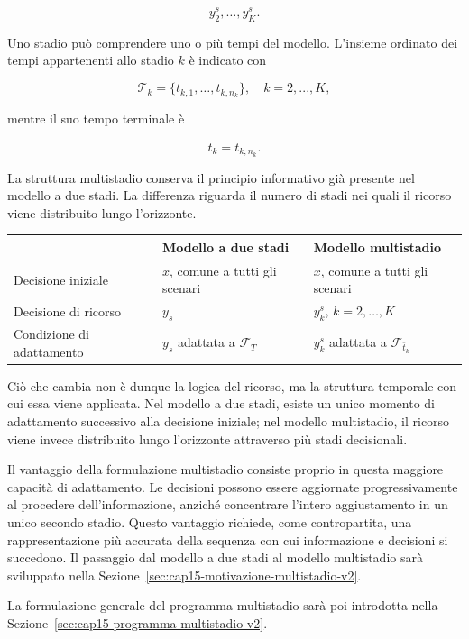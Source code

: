 \[
y_2^s,\ldots,y_K^s.
\]

Uno stadio pu\`o comprendere uno o pi\`u tempi del modello. L'insieme ordinato
dei tempi appartenenti allo stadio $k$ \`e indicato con

\[
\mathcal T_k
=
\{t_{k,1},\ldots,t_{k,n_k}\}, \quad k=2,...,K,
\] 

\noindent mentre il suo tempo terminale \`e

\[
\bar t_k
=
t_{k,n_k}.
\]

La struttura multistadio conserva il principio informativo gi\`a presente
nel modello a due stadi. La differenza riguarda il numero di stadi nei quali
il ricorso viene distribuito lungo l'orizzonte.

\begin{center}
\begin{tabular}{|p{2.8cm}|p{3.7cm}|p{3.7cm}|}
\hline
 & \textbf{Modello a due stadi} & \textbf{Modello multistadio} \\
\hline
\raggedright Decisione iniziale
&
$x$, comune a tutti gli scenari
&
$x$, comune a tutti gli scenari
\\
\hline
\raggedright Decisione di ricorso
&
$y_s$
&
$y_k^s$, \quad $k=2,\ldots,K$
\\
\hline
\raggedright Condizione di adattamento
&
$y_s$ adattata a $\mathcal F_T$
&
$y_k^s$ adattata a $\mathcal F_{\bar t_k}$
\\
\hline
\end{tabular}
\end{center}

Ci\`o che cambia non \`e dunque la logica del ricorso, ma la struttura
temporale con cui essa viene applicata. Nel modello a due stadi, esiste un
unico momento di adattamento successivo alla decisione iniziale; nel modello
multistadio, il ricorso viene invece distribuito lungo l'orizzonte attraverso
pi\`u stadi decisionali.

Il vantaggio della formulazione multistadio consiste proprio in questa
maggiore capacit\`a di adattamento. Le decisioni possono essere aggiornate
progressivamente al procedere dell'informazione, anzich\'e concentrare
l'intero aggiustamento in un unico secondo stadio. Questo vantaggio richiede,
come contropartita, una rappresentazione pi\`u accurata della sequenza con cui
informazione e decisioni si succedono. Il passaggio dal modello a due stadi
al modello multistadio sar\`a sviluppato nella
Sezione~\ref{sec:cap15-motivazione-multistadio-v2}.

La formulazione generale del programma multistadio sar\`a poi introdotta
nella Sezione~\ref{sec:cap15-programma-multistadio-v2}.

